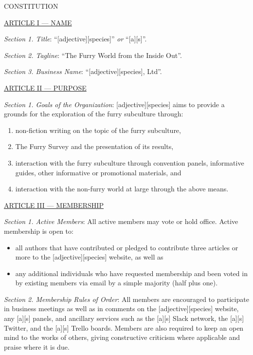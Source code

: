 \documentclass{article}
\begin{document}
\begin{center}
\Huge{CONSTITUTION}
\end{center}

\bigskip

\large{\underline{ARTICLE I --- NAME}}

\emph{Section 1. Title}: ``[adjective][species]'' \emph{or} ``[a][s]''.

\emph{Section 2. Tagline}: ``The Furry World from the Inside Out''.

\emph{Section 3. Business Name}: ``[adjective][species], Ltd''.

\bigskip

\large{\underline{ARTICLE II --- PURPOSE}}

\emph{Section 1. Goals of the Organization}: [adjective][species] aims to provide a grounds for the exploration of the furry subculture through:
\begin{enumerate}
  \item non-fiction writing on the topic of the furry subculture,
  \item The Furry Survey and the presentation of its results,
  \item interaction with the furry subculture through convention panels, informative guides, other informative or promotional materials, and
  \item interaction with the non-furry world at large through the above means.
\end{enumerate}

\bigskip

\large{\underline{ARTICLE III --- MEMBERSHIP}}

\emph{Section 1. Active Members}: All active members may vote or hold office.  Active membership is open to:
\begin{itemize}
  \item all authors that have contributed or pledged to contribute three articles or more to the [adjective][species] website, as well as
  \item any additional individuals who have requested membership and been voted in by existing members via email by a simple majority (half plus one).
\end{itemize}

\emph{Section 2. Membership Rules of Order}: All members are encouraged to participate in business meetings as well as in comments on the [adjective][species] website, any [a][s] panels, and ancillary services such as the [a][s] Slack network, the [a][s] Twitter, and the [a][s] Trello boards.  Members are also required to keep an open mind to the works of others, giving constructive criticism where applicable and praise where it is due.
\end{document}
